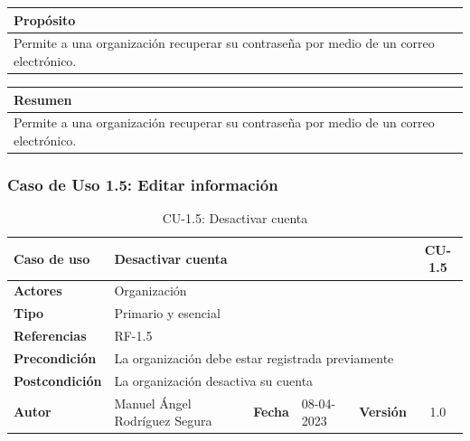 \begin{table}[H]
    \centering
    \begin{tabularx}{\textwidth}{@{} |L |@{}} \hline
        \textbf{Propósito} \\
        \hline
        Permite a una organización recuperar su contraseña por medio de un correo electrónico. \\
        \hline
    \end{tabularx}
\end{table}

\begin{table}[H]
    \centering
    \begin{tabularx}{\textwidth}{@{} |L |@{}} \hline
        \textbf{Resumen} \\
        \hline
        Permite a una organización recuperar su contraseña por medio de un correo electrónico. \\
        \hline
    \end{tabularx}
\end{table}

\subsubsection{Caso de Uso 1.5: Editar información}\label{subsubsec:editar-informacion-org}

\begin{table}[H]
    \begin{center}
        \begin{adjustbox}{width=\textwidth}
            \begin{tabular}{ | l | l | l | l | c | c | }
                \hline
                \textbf{Caso de uso} & \multicolumn{4}{l|}{Desactivar cuenta} & \cellcolor{gray!50} \textbf{CU-1.5}\\
                \hline
                \textbf{Actores} & \multicolumn{5}{p{0.5\linewidth}|}{Organización} \\
                \hline
                \textbf{Tipo} & \multicolumn{5}{l|}{Primario y esencial} \\
                \hline
                \textbf{Referencias} & \multicolumn{3}{l|}{RF-1.5} & \multicolumn{2}{l|}{ }\\
                \hline
                \textbf{Precondición} & \multicolumn{5}{l|}{La organización debe estar registrada previamente} \\
                \hline
                \textbf{Postcondición} & \multicolumn{5}{l|}{La organización desactiva su cuenta} \\
                \hline
                \textbf{Autor} & \multicolumn{1}{p{0.25\linewidth}|}{Manuel Ángel Rodríguez Segura} & \textbf{Fecha} &
                08-04-2023     & \textbf{Versión}                                                      & 1.0\\
                \hline
            \end{tabular}
        \end{adjustbox}
        \caption{CU-1.5: Desactivar cuenta}
        \label{tab:desactivar-cuenta}
    \end{center}
\end{table}

